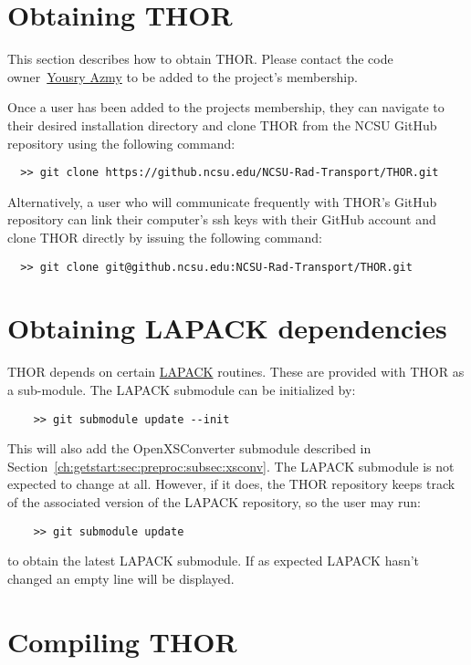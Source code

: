 \section{Obtaining THOR}

This section describes how to obtain \ac{THOR}.
Please contact the code owner~\href{mailto:yyazmy@ncsu.edu}{Yousry Azmy} to be added to the project's membership.

Once a user has been added to the projects membership, they can navigate to their desired installation directory and clone \ac{THOR} from the \ac{NCSU} GitHub repository using the following command:
\begin{verbatim}
  >> git clone https://github.ncsu.edu/NCSU-Rad-Transport/THOR.git
\end{verbatim}
Alternatively, a user who will communicate frequently with \ac{THOR}'s GitHub repository can link their computer's ssh keys with their GitHub account and clone \ac{THOR} directly by issuing the following command:
\begin{verbatim}
  >> git clone git@github.ncsu.edu:NCSU-Rad-Transport/THOR.git
\end{verbatim}

\section{Obtaining LAPACK dependencies}

\ac{THOR} depends on certain \href{http://www.netlib.org/lapack/}{\ac{LAPACK}} routines.
These are provided with \ac{THOR} as a sub-module.
The \ac{LAPACK} submodule can be initialized by:
\begin{verbatim}
    >> git submodule update --init
\end{verbatim}
This will also add the OpenXSConverter submodule described in Section~\ref{ch:getstart:sec:preproc:subsec:xsconv}.
The \ac{LAPACK} submodule is not expected to change at all.
However, if it does, the \ac{THOR} repository keeps track of the associated version of the \ac{LAPACK} repository, so the user may run:
\begin{verbatim}
    >> git submodule update
\end{verbatim}
to obtain the latest \ac{LAPACK} submodule.
If as expected \ac{LAPACK} hasn't changed an empty line will be displayed.

\section{Compiling THOR}

